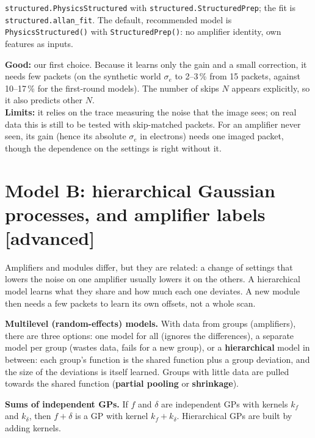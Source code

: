\documentclass[11pt]{article}
\newcommand{\code}[1]{\texttt{#1}}
\newcommand{\level}[1]{\hfill{\normalfont\small\color{black!60}[#1]}}
\begin{document}
\begin{ours}
\code{structured.PhysicsStructured} with \code{structured.StructuredPrep}; the fit is \code{structured.allan\_fit}. The default,
recommended model is \code{PhysicsStructured()} with \code{StructuredPrep()}: no amplifier identity, own features as inputs.
\end{ours}

\begin{when}
\textbf{Good:} our first choice. Because it learns only the gain and a small correction, it needs few packets (on the synthetic world
$\sigma_e$ to 2--3\,\% from 15 packets, against 10--17\,\% for the first-round models). The number of skips $N$ appears explicitly,
so it also predicts other $N$.\\
\textbf{Limits:} it relies on the trace measuring the noise that the image sees; on real data this is still to be tested with
skip-matched packets. For an amplifier never seen, its gain (hence its absolute $\sigma_e$ in electrons) needs one imaged packet,
though the dependence on the settings is right without it.
\end{when}

\section{Model B: hierarchical Gaussian processes, and amplifier labels \level{advanced}}
\label{sec:hier}

\begin{idea}
Amplifiers and modules differ, but they are related: a change of settings that lowers the noise on one amplifier usually lowers it
on the others. A hierarchical model learns what they share and how much each one deviates. A new module then needs a few packets
to learn its own offsets, not a whole scan.
\end{idea}

\begin{background}
\textbf{Multilevel (random-effects) models.} With data from groups (amplifiers), there are three options: one model for all
(ignores the differences), a separate model per group (wastes data, fails for a new group), or a \textbf{hierarchical} model in
between: each group's function is the shared function plus a group deviation, and the size of the deviations is itself learned.
Groups with little data are pulled towards the shared function (\textbf{partial pooling} or \textbf{shrinkage}).

\textbf{Sums of independent GPs.} If $f$ and $\delta$ are independent GPs with kernels $k_f$ and $k_\delta$, then $f + \delta$ is a
GP with kernel $k_f + k_\delta$. Hierarchical GPs are built by adding kernels.
\end{background}
\end{document}
